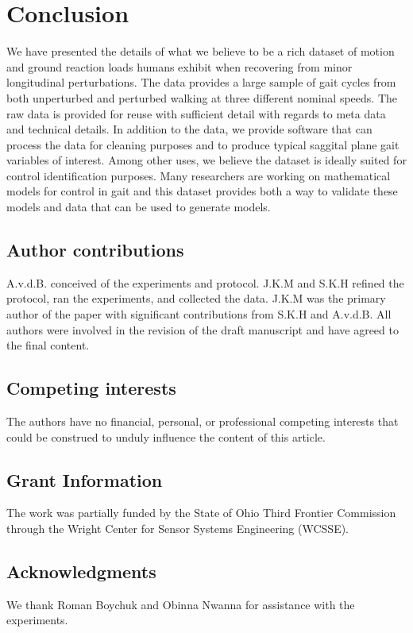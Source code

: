 \documentclass[10pt,a4paper,twocolumn]{article}
\begin{document}
\section*{Conclusion}

We have presented the details of what we believe to be a rich dataset of motion
and ground reaction loads humans exhibit when recovering from minor
longitudinal perturbations. The data provides a large sample of gait cycles
from both unperturbed and perturbed walking at three different nominal speeds.
The raw data is provided for reuse with sufficient detail with regards to meta
data and technical details. In addition to the data, we provide software that
can process the data for cleaning purposes and to produce typical saggital
plane gait variables of interest. Among other uses, we believe the dataset is
ideally suited for control identification purposes. Many researchers are
working on mathematical models for control in gait and this dataset provides
both a way to validate these models and data that can be used to generate
models.

\subsection*{Author contributions}
A.v.d.B. conceived of the experiments and protocol. J.K.M and S.K.H refined the
protocol, ran the experiments, and collected the data. J.K.M was the primary
author of the paper with significant contributions from S.K.H and A.v.d.B. All
authors were involved in the revision of the draft manuscript and have agreed
to the final content.

\subsection*{Competing interests}
The authors have no  financial, personal, or professional competing interests
that could be construed to unduly influence the content of this article.

\subsection*{Grant Information}
The work was partially funded by the State of Ohio Third Frontier Commission
through the Wright Center for Sensor Systems Engineering (WCSSE).

\subsection*{Acknowledgments}
We thank Roman Boychuk and Obinna Nwanna for assistance with the experiments.

{\small
}
\end{document}

